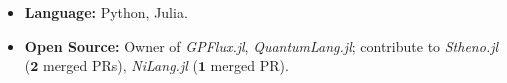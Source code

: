 {\fontsize{11pt}{1.5em}
\begin{itemize}
  \item \textbf{Language:} Python, Julia.
  \item \textbf{Open Source:} Owner of \textit{GPFlux.jl}, \textit{QuantumLang.jl}; 
  contribute to \textit{Stheno.jl} ($\mathbf{2}$ merged PRs), \textit{NiLang.jl} ($\mathbf{1}$ merged PR).
\end{itemize}
}
